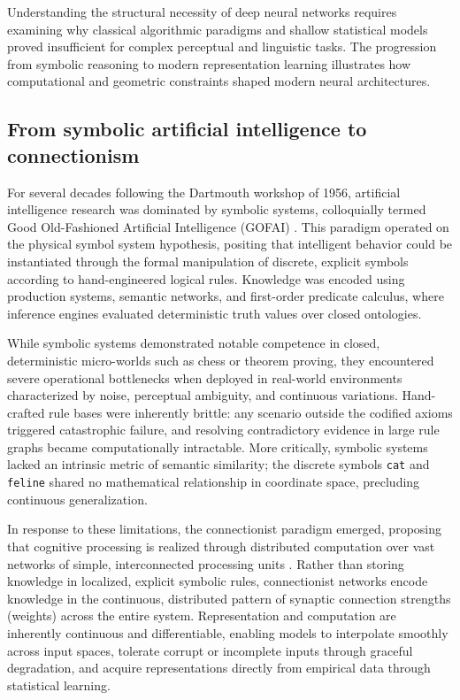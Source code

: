 \documentclass[../../../main.tex]{subfiles}
\begin{document}
Understanding the structural necessity of deep neural networks requires examining why classical algorithmic paradigms and shallow statistical models proved insufficient for complex perceptual and linguistic tasks. The progression from symbolic reasoning to modern representation learning illustrates how computational and geometric constraints shaped modern neural architectures.

\subsection{From symbolic artificial intelligence to connectionism}
\label{subsec:symbolic_to_connectionism}

For several decades following the Dartmouth workshop of 1956, artificial intelligence research was dominated by symbolic systems, colloquially termed Good Old-Fashioned Artificial Intelligence (GOFAI) \citep{russell2020artificial}. This paradigm operated on the physical symbol system hypothesis, positing that intelligent behavior could be instantiated through the formal manipulation of discrete, explicit symbols according to hand-engineered logical rules. Knowledge was encoded using production systems, semantic networks, and first-order predicate calculus, where inference engines evaluated deterministic truth values over closed ontologies.

While symbolic systems demonstrated notable competence in closed, deterministic micro-worlds such as chess or theorem proving, they encountered severe operational bottlenecks when deployed in real-world environments characterized by noise, perceptual ambiguity, and continuous variations. Hand-crafted rule bases were inherently brittle: any scenario outside the codified axioms triggered catastrophic failure, and resolving contradictory evidence in large rule graphs became computationally intractable. More critically, symbolic systems lacked an intrinsic metric of semantic similarity; the discrete symbols \texttt{cat} and \texttt{feline} shared no mathematical relationship in coordinate space, precluding continuous generalization.

In response to these limitations, the connectionist paradigm emerged, proposing that cognitive processing is realized through distributed computation over vast networks of simple, interconnected processing units \citep{mcculloch1943,rosenblatt1958,rumelhart1986}. Rather than storing knowledge in localized, explicit symbolic rules, connectionist networks encode knowledge in the continuous, distributed pattern of synaptic connection strengths (weights) across the entire system. Representation and computation are inherently continuous and differentiable, enabling models to interpolate smoothly across input spaces, tolerate corrupt or incomplete inputs through graceful degradation, and acquire representations directly from empirical data through statistical learning.
\end{document}
